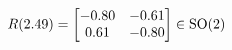 \documentclass[preview]{standalone}
\begin{document}
\begin{align*}
\special{dvisvgm:raw <g id='unique000'>}R(2.49) = \begin{bmatrix} -0.80 & -0.61 \\ 0.61 & -0.80 \end{bmatrix} \in \text{SO}(2)\special{dvisvgm:raw </g>}
\end{align*}
\end{document}
